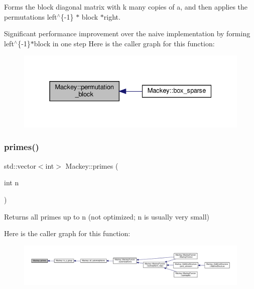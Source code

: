 Forms the block diagonal matrix with k many copies of a, and then applies the permutations left$^\wedge$\{-\/1\} $\ast$ block $\ast$right. 

Significant performance improvement over the naive implementation by forming left$^\wedge$\{-\/1\}$\ast$block in one step Here is the caller graph for this function\+:\nopagebreak
\begin{figure}[H]
\begin{center}
\leavevmode
\includegraphics[width=331pt]{namespaceMackey_ae54ebc8588d873a744541394ac5113f0_icgraph}
\end{center}
\end{figure}
\mbox{\label{namespaceMackey_aa136aece9117704b3e5180d92484ed10}} 
\subsubsection{\texorpdfstring{primes()}{primes()}}
{\footnotesize\ttfamily std\+::vector$<$int$>$ Mackey\+::primes (\begin{DoxyParamCaption}\item[{int}]{n }\end{DoxyParamCaption})}



Returns all primes up to n (not optimized; n is usually very small) 

Here is the caller graph for this function\+:\nopagebreak
\begin{figure}[H]
\begin{center}
\leavevmode
\includegraphics[width=350pt]{namespaceMackey_aa136aece9117704b3e5180d92484ed10_icgraph}
\end{center}
\end{figure}
\mbox{\label{namespaceMackey_a8a3b4c6cc908044298e8e287298b9b99}} 
